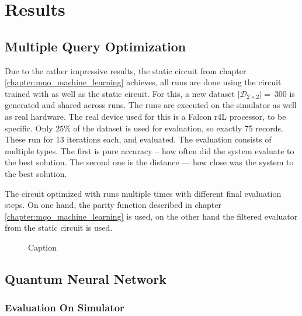 \chapter{Results} %

\label{chapter:results} %


\section{Multiple Query Optimization}

Due to the rather impressive results, the static circuit from chapter \ref{chapter:mqo_machine_learning} achieves, all runs are done using the circuit trained with  as well as the static circuit. For this, a new dataset $\left|\mathcal{D}_{2\times2}\right| =\ 300$ is generated and shared across runs. The runs are executed on the simulator as well as real hardware. The real device used for this is a Falcon r4L processor,  to be specific. Only $25\%$ of the dataset is used for evaluation, so exactly 75 records. These run for 13 iterations each, and evaluated. The evaluation consists of multiple types. The first is pure accuracy – how often did the system evaluate to the best solution. The second one is the distance — how close was the system to the best solution. \par
The circuit optimized with  runs multiple times with different final evaluation steps. On one hand, the parity function described in chapter \ref{chapter:mqo_machine_learning} is used, on the other hand the filtered evaluator from the static circuit is used.


\begin{figure}
    \centering
    \scalebox{0.9}{
        
    }
    \caption{Caption}
    \label{fig:my_label}
\end{figure}

\newpage

\section{Quantum Neural Network}

\subsection{Evaluation On Simulator}


